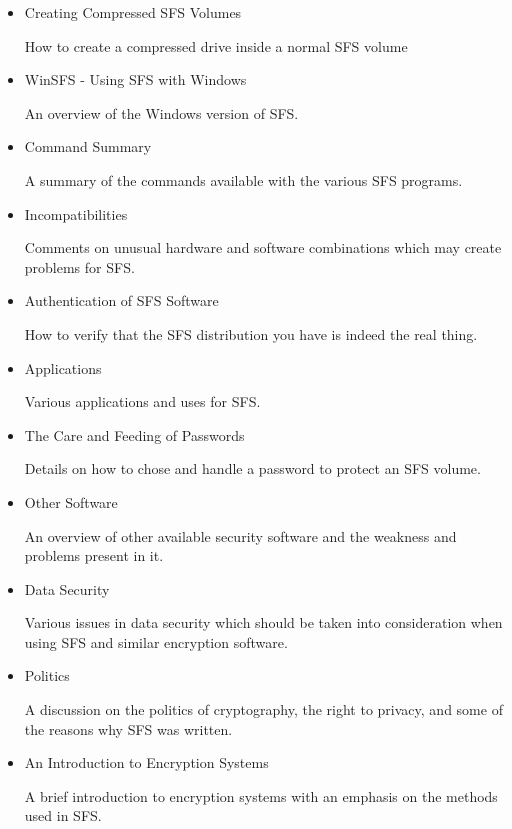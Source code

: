 \begin{itemize}
\item Creating Compressed SFS Volumes

        How to create a compressed drive inside a normal SFS volume

\item WinSFS - Using SFS with Windows

        An overview of the Windows version of SFS.

\item Command Summary

        A summary of the commands available with the various SFS
        programs.

\item Incompatibilities

        Comments on unusual hardware and software combinations which
        may create problems for SFS.

\item Authentication of SFS Software

        How to verify that the SFS distribution you have is indeed the
        real thing.

\item Applications

        Various applications and uses for SFS.

\item The Care and Feeding of Passwords

        Details on how to chose and handle a password to protect
        an SFS volume.

\item Other Software

        An overview of other available security software and the
        weakness and problems present in it.

\item Data Security

        Various issues in data security which should be taken into
        consideration when using SFS and similar encryption software.

\item Politics

        A discussion on the politics of cryptography, the right to
        privacy, and some of the reasons why SFS was written.

\item An Introduction to Encryption Systems

        A brief introduction to encryption systems with an emphasis
        on the methods used in SFS.


\end{itemize}

